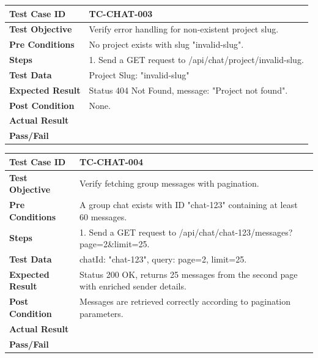 \begin{longtable}{|p{}|p{}|}
\hline
\textbf{Test Case ID} & TC-CHAT-003 \\ \hline
\textbf{Test Objective} & Verify error handling for non-existent project slug. \\ \hline
\textbf{Pre Conditions} & No project exists with slug "invalid-slug". \\ \hline
\textbf{Steps} & 
1. Send a GET request to /api/chat/project/invalid-slug. \\ \hline
\textbf{Test Data} & Project Slug: "invalid-slug" \\ \hline
\textbf{Expected Result} & Status 404 Not Found, message: "Project not found". \\ \hline
\textbf{Post Condition} & None. \\ \hline
\textbf{Actual Result} &  \\ \hline
\textbf{Pass/Fail} &  \\ \hline
\end{longtable}

\begin{longtable}{|p{}|p{}|}
\hline
\textbf{Test Case ID} & TC-CHAT-004 \\ \hline
\textbf{Test Objective} & Verify fetching group messages with pagination. \\ \hline
\textbf{Pre Conditions} & A group chat exists with ID "chat-123" containing at least 60 messages. \\ \hline
\textbf{Steps} & 
1. Send a GET request to /api/chat/chat-123/messages?page=2\&limit=25. \\ \hline
\textbf{Test Data} & chatId: "chat-123", query: page=2, limit=25. \\ \hline
\textbf{Expected Result} & Status 200 OK, returns 25 messages from the second page with enriched sender details. \\ \hline
\textbf{Post Condition} & Messages are retrieved correctly according to pagination parameters. \\ \hline
\textbf{Actual Result} &  \\ \hline
\textbf{Pass/Fail} &  \\ \hline
\end{longtable}

